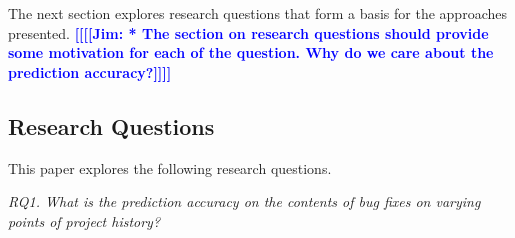 \documentclass[10pt, conference, letterpaper, compsocconf]{IEEEtran}
\newcommand{\todoc}[2]{{\textcolor{#1} {\textbf{[[#2]]}}}}
\newcommand{\todoblue}[1]{\todoc{blue}{\textbf{[[#1]]}}}
\newcommand{\jim}[1]{\todoblue{Jim: #1}}
\begin{document}
%

The next section explores research questions that form a basis for the approaches presented.
\jim{* The section on research questions should provide some motivation for each of the question. Why do we care about the prediction accuracy?}
\subsection{Research Questions}
This paper explores the following research questions.

\textit{RQ1. What is the prediction accuracy on the contents
of bug fixes on varying points of project history?}
\end{document}
